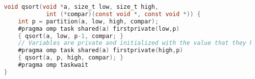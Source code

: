 %
\clearpage
%
%
\clearpage
%
\begin{tcolorbox}[colback=nightblue!5!white, colframe=nightblue!75!black, title= Quicksort Analysis]
    \begin{lstlisting}[label={lst:quicksort1}, language=C, morekeywords={pragma, omp, task, shared, firstprivate, low, high, taskwait}]
void qsort(void *a, size_t low, size_t high,
            int (*compar)(const void *, const void *)) {
    int p = partition(a, low, high, compar);
    #pragma omp task shared(a) firstprivate(low,p)
    { qsort(a, low, p-1, compar; }
    // Variables are private and initialized with the value that they had before the spawning of the task
    #pragma omp task shared(a) firstprivate(high,p)
    { qsort(a, p, high, compar); }
    #pragma omp taskwait
}\end{lstlisting}
\end{tcolorbox}
\par
